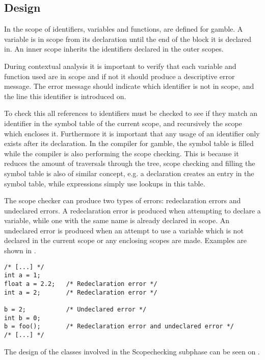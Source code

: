 \subsection*{Design}
In  the scope of identifiers, variables and functions, are defined for \gls{gamble}.
A variable is in scope from its declaration until the end of the block it is declared in.
An inner scope inherits the identifiers declared in the outer scopes. 

During contextual analysis it is important to verify that each variable and function used are in scope and if not it should produce a descriptive error message.
The error message should indicate which identifier is not in scope, and the line this identifier is introduced on.

To check this all references to identifiers must be checked to see if they match an identifier in the symbol table of the current scope, and recursively the scope which encloses it. 
Furthermore it is important that any usage of an identifier only exists after its declaration.
In the compiler for \gls{gamble}, the symbol table is filled while the compiler is also performing the scope checking.
This is because it reduces the amount of traversals through the tree, scope checking and filling the symbol table is also of similar concept, e.g. a declaration creates an entry in the symbol table, while expressions simply use lookups in this table.

The scope checker can produce two types of errors: redeclaration errors and undeclared errors.
A redeclaration error is produced when attempting to declare a variable, while one with the same name is already declared in scope.
An undeclared error is produced when an attempt to use a variable which is not declared in the current scope or any enclosing scopes are made. 
Examples are shown in .

\begin{lstlisting}[caption=Examples of scope errors in \gls{gamble}, numbers=none,frame=tlrb,label={lst:scopeErrors}]
/* [...] */
int a = 1;
float a = 2.2;   /* Redeclaration error */
int a = 2;       /* Redeclaration error */ 

b = 2;           /* Undeclared error */   
int b = 0;
b = foo();       /* Redeclaration error and undeclared error */ 
/* [...] */
\end{lstlisting}

The design of the classes involved in the Scopechecking subphase can be seen on .

